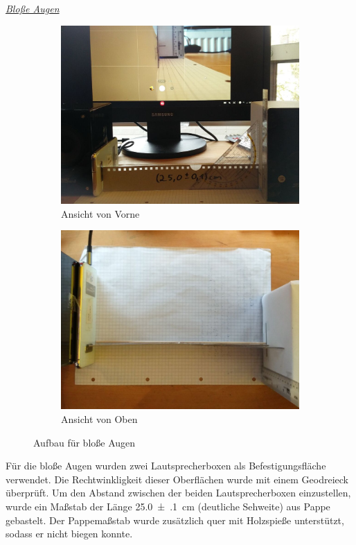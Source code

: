 		\vspace{0.5\baselineskip}
		\underline{\large\textit{Bloße Augen}}
		\vspace{0.5\baselineskip}

			\begin{figure}[H]
				\centering
				\begin{subfigure}[b]{0.48\textwidth}
					\includegraphics[width=\textwidth]{images/tv3/tv3-aufbau-01.jpg}
					\caption{Ansicht von Vorne}
				\end{subfigure}
				\hspace{5pt}
				\begin{subfigure}[b]{0.48\textwidth}
					\includegraphics[width=\textwidth]{images/tv3/tv3-aufbau-02.jpg}
					\caption{Ansicht von Oben}
				\end{subfigure}
				\caption{Aufbau für bloße Augen}
				\label{fig:tv3-fern-aufbau}
				\vspace{-10pt}
			\end{figure}
			Für die bloße Augen wurden zwei Lautsprecherboxen als Befestigungsfläche verwendet. Die Rechtwinkligkeit dieser Oberflächen wurde mit einem Geodreieck überprüft. Um den Abstand zwischen der beiden Lautsprecherboxen einzustellen, wurde ein Maßstab der Länge \SI{25.0(1)}{\centi\meter} (deutliche Sehweite) aus Pappe gebastelt. Der Pappemaßstab wurde zusätzlich quer mit Holzspieße unterstützt, sodass er nicht biegen konnte. 

